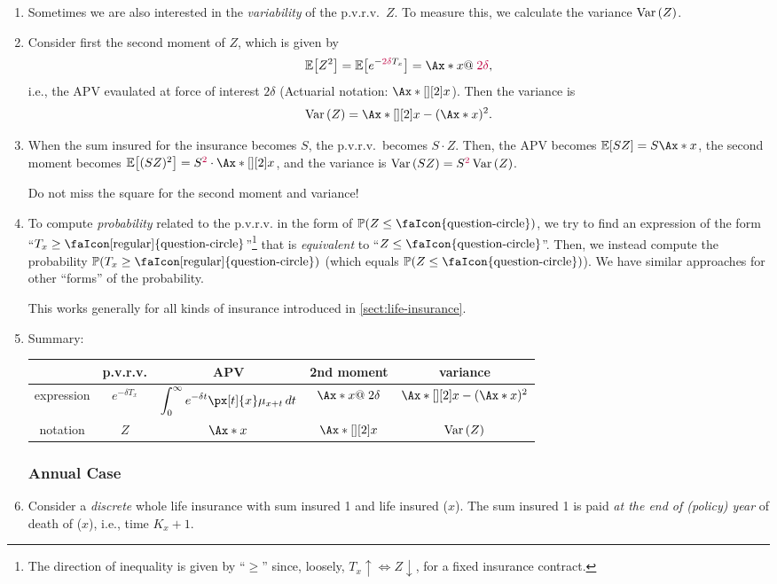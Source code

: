 \begin{enumerate}
\item Sometimes we are also interested in the \emph{variability} of the
p.v.r.v.\ \(Z\). To measure this, we calculate the variance \(\operatorname{Var}\qty(Z)\).
\item Consider first the second moment of \(Z\), which is given by
\[
\expv{Z^2}=\expv{e^{-{\color{purple} 2\delta} T_x}}=\Ax*{x}@\;{\color{purple} 2\delta},
\]
i.e., the APV evaulated at force of interest \(2\delta\) (Actuarial notation:
\(\Ax*[][2]{x}\)). Then the variance is
\[
\vari{Z}=\Ax*[][2]{x}-(\Ax*{x})^2.
\]
\item When the sum insured for the insurance becomes \( S\), the p.v.r.v.\
becomes \(S\cdot Z\). Then, the APV becomes \(\expv{SZ}=S\Ax*{x}\), the second
moment becomes \(\expv{(SZ)^2}=S^{\color{purple}2}\cdot\Ax*[][2]{x}\), and the
variance is \(\operatorname{Var}\qty(SZ)=S^{\color{purple}2}\operatorname{Var}\qty(Z)\).
\begin{warning}
Do not miss the square for the second moment and variance!
\end{warning}
\item To compute \emph{probability} related to the p.v.r.v. in the form
of \(\prob{Z\le \text{\faIcon{question-circle}}}\), we try to find an
expression of the form
``\(T_x\ge\text{\faIcon[regular]{question-circle}}\)''\footnote{The direction
of inequality is given by ``\(\ge\)'' since, loosely, \(T_x\uparrow\iff
Z\downarrow\), for a fixed insurance contract.}  that is \emph{equivalent} to
``\(Z\le \text{\faIcon{question-circle}}\)''. Then, we instead compute the
probability \(\prob{T_x\ge\text{\faIcon[regular]{question-circle}}}\) (which
equals \(\prob{Z\le \text{\faIcon{question-circle}}}\)). We have similar
approaches for other ``forms'' of the probability.
\begin{note}
This works generally for all kinds of insurance introduced in
\cref{sect:life-insurance}.
\end{note}
\item
\label{it:cts-whole-life-fmlas}
 Summary:

\begin{tabular}{ccccc}
\toprule
&p.v.r.v.&APV&2nd moment&variance\\
\midrule
expression&\(e^{-\delta T_x}\)&\(\displaystyle\int_{0}^{\infty}e^{-\delta t}\px[t]{x}\mu_{x+t}\,dt\)
&\(\Ax*{x}@\;2\delta\)&\(\Ax*[][2]{x}-(\Ax*{x})^2\)\\
notation&\(Z\)&\(\Ax*{x}\)&\(\Ax*[][2]{x}\)&\(\operatorname{Var}\qty(Z)\)\\
\bottomrule
\end{tabular}
\subsubsection*{Annual Case}
\item Consider a \emph{discrete} whole life insurance with sum insured
\faIcon{money-bill-wave} 1 and life insured (\(x\)). The sum insured 1 is
paid \emph{at the end of (policy) year} of death of (\(x\)), i.e., time
\(K_x+1\).


\end{enumerate}
